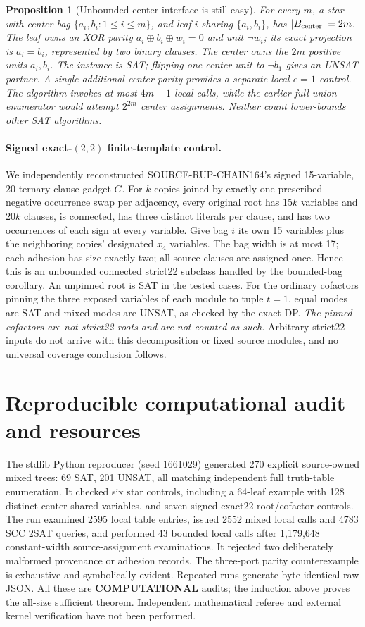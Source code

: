 \documentclass[11pt]{article}
\newtheorem{proposition}[theorem]{Proposition}
\begin{document}
\begin{proposition}[Unbounded center interface is still easy]
For every $m$, a star with center bag $\{a_i,b_i:1\le i\le m\}$, and
leaf $i$ sharing $\{a_i,b_i\}$, has $|B_{\rm center}|=2m$. The leaf
owns an XOR parity $a_i\oplus b_i\oplus w_i=0$ and unit $\neg w_i$;
its exact projection is $a_i=b_i$, represented by two binary clauses.
The center owns the $2m$ positive units $a_i,b_i$. The instance is SAT;
flipping one center unit to $\neg b_1$ gives an UNSAT partner. A single
additional center parity provides a separate local $e=1$ control.
The algorithm invokes at most $4m+1$ local calls, while the earlier
\emph{full-union enumerator} would attempt $2^{2m}$ center assignments.
Neither count lower-bounds other SAT algorithms.
\end{proposition}

\paragraph{Signed exact-$(2,2)$ finite-template control.}
We independently reconstructed SOURCE-RUP-CHAIN164's signed 15-variable,
20-ternary-clause gadget $G$. For $k$ copies joined by exactly one prescribed
negative occurrence swap per adjacency, every original root has $15k$
variables and $20k$ clauses, is connected, has three distinct literals per
clause, and has two occurrences of each sign at every variable. Give bag
$i$ its own 15 variables plus the neighboring copies' designated $x_4$
variables. The bag width is at most 17; each adhesion has size exactly two;
all source clauses are assigned once. Hence this is an unbounded connected
strict22 subclass handled by the bounded-bag corollary. An unpinned root is
SAT in the tested cases. For the ordinary cofactors pinning the three exposed
variables of each module to tuple $t=1$, equal modes are SAT and mixed modes
are UNSAT, as checked by the exact DP. \emph{The pinned cofactors are not
strict22 roots and are not counted as such.} Arbitrary strict22 inputs do not
arrive with this decomposition or fixed source modules, and no universal
coverage conclusion follows.

\section{Reproducible computational audit and resources}
The stdlib Python reproducer (seed 1661029) generated 270 explicit
source-owned mixed trees: 69 SAT, 201 UNSAT, all matching independent full
truth-table enumeration. It checked six star controls, including a
64-leaf example with 128 distinct center shared variables, and seven signed
exact22-root/cofactor controls. The run examined 2595 local table entries,
issued 2552 mixed local calls and 4783 SCC 2SAT queries, and performed 43
bounded local calls after 1,179,648 constant-width source-assignment
examinations. It rejected two deliberately malformed provenance or
adhesion records. The three-port parity counterexample is exhaustive and
symbolically evident. Repeated runs generate byte-identical raw JSON.
All these are \textbf{COMPUTATIONAL} audits; the induction above proves the
all-size sufficient theorem. Independent mathematical referee and external
kernel verification have not been performed.
\end{document}
